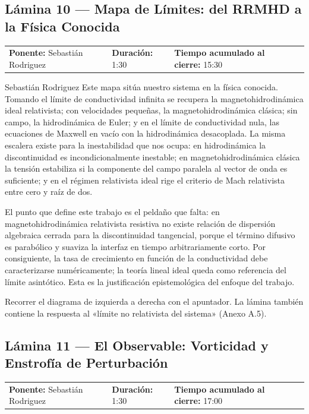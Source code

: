 \documentclass[11pt,letterpaper]{article}
\makeatletter
\newcommand{\lamina}[5]{%
  \subsection*{Lámina #1 --- #2}
  \noindent
  \begin{tabular}{@{}llll@{}}
    \textbf{Ponente:} #3 &\quad \textbf{Duración:} #4 &\quad
    \textbf{Tiempo acumulado al cierre:} #5 &
  \end{tabular}
  \vspace{2pt}}
\makeatother
\begin{document}
\lamina{10}{Mapa de Límites: del RRMHD a la Física Conocida}{Sebastián Rodriguez}{1:30}{15:30}

\begin{parlamento}{Sebastián Rodriguez}
Este mapa sitúa nuestro sistema en la física conocida. Tomando el límite de
conductividad infinita se recupera la magnetohidrodinámica ideal
relativista; con velocidades pequeñas, la magnetohidrodinámica clásica; sin
campo, la hidrodinámica de Euler; y en el límite de conductividad nula, las
ecuaciones de Maxwell en vacío con la hidrodinámica desacoplada. La misma
escalera existe para la inestabilidad que nos ocupa: en hidrodinámica la
discontinuidad es incondicionalmente inestable; en magnetohidrodinámica
clásica la tensión estabiliza si la componente del campo paralela al vector
de onda es suficiente; y en el régimen relativista ideal rige el criterio de
Mach relativista entre cero y raíz de dos.

El punto que define este trabajo es el peldaño que falta: en
magnetohidrodinámica relativista resistiva no existe relación de dispersión
algebraica cerrada para la discontinuidad tangencial, porque el término
difusivo es parabólico y suaviza la interfaz en tiempo arbitrariamente
corto. Por consiguiente, la tasa de crecimiento en función de la
conductividad debe caracterizarse numéricamente; la teoría lineal ideal
queda como referencia del límite asintótico. Esta es la justificación
epistemológica del enfoque del trabajo.
\end{parlamento}

\begin{indicaciones}
Recorrer el diagrama de izquierda a derecha con el apuntador. La lámina
también contiene la respuesta al «límite no relativista del sistema»
(Anexo A.5).
\end{indicaciones}

\lamina{11}{El Observable: Vorticidad y Enstrofía de Perturbación}{Sebastián Rodriguez}{1:30}{17:00}
\end{document}
